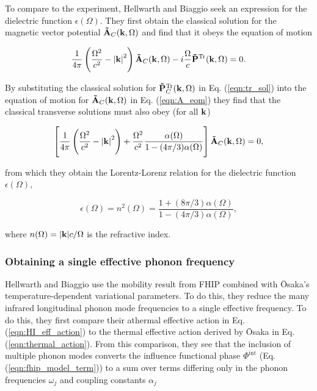 To compare to the experiment, Hellwarth and Biaggio seek an expression for the dielectric function $\epsilon(\Omega)$. They first obtain the classical solution for the magnetic vector potential $\vb{\Tilde{A}}_C(\vb{k}, \Omega)$ and find that it obeys the equation of motion 

\begin{equation}\label{eqn:A_eom}
    \frac{1}{4\pi} \left( \frac{\Omega^2}{c^2} - \abs{\vb{k}}^2 \right) \vb{\Tilde{A}}_C(\vb{k}, \Omega) - i \frac{\Omega}{c} \vb{\Tilde{P}}^{\text{Tr}}(\vb{k}, \Omega) = 0.
\end{equation}

By substituting the classical solution for $\vb{\Tilde{P}}^{\text{Tr}}_{C}(\vb{k}, \Omega)$ in Eq. (\ref{eqn:tr_sol}) into the equation of motion for $\vb{\Tilde{A}}_C(\vb{k}, \Omega)$ in Eq. (\ref{eqn:A_eom}) they find that the classical transverse solutions must also obey (for all $\vb{k}$)

\begin{equation}
    \left[ \frac{1}{4\pi} \left( \frac{\Omega^2}{c^2} - \abs{\vb{k}}^2 \right) + \frac{\Omega^2}{c^2} \frac{\alpha(\Omega)}{1 - (4\pi / 3) \alpha(\Omega)} \right] \vb{\Tilde{A}}_C(\vb{k}, \Omega) = 0,
\end{equation}

from which they obtain the Lorentz-Lorenz relation for the dielectric function $\epsilon(\Omega)$,

\begin{equation}
    \epsilon(\Omega) = n^2(\Omega) = \frac{1 + (8\pi/3)\alpha(\Omega)}{1 - (4\pi/3)\alpha(\Omega)},
\end{equation}

where $n(\Omega) = \abs{\vb{k}} c / \Omega$ is the refractive index.

\subsubsection{Obtaining a single effective phonon frequency}
\label{subsubsec:2-3-3-5}

Hellwarth and Biaggio use the mobility result from FHIP combined with \=Osaka's temperature-dependent variational parameters. To do this, they reduce the many infrared longitudinal phonon mode frequencies to a single effective frequency. To do this, they first compare their athermal effective action in Eq. (\ref{eqn:HI_eff_action}) to the thermal effective action derived by \=Osaka in Eq. (\ref{eqn:thermal_action}). From this comparison, they see that the inclusion of multiple phonon modes converts the influence functional phase $\Phi^{\text{int}}$ (Eq. (\ref{eqn:fhip_model_term})) to a sum over terms differing only in the phonon frequencies $\omega_j$ and coupling constants $\alpha_j$

